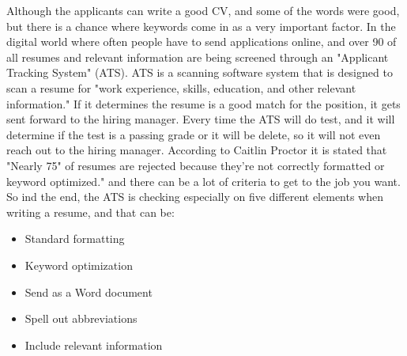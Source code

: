 Although the applicants can write a good CV, and some of the words were good,
but there is a chance where keywords come in as a very important factor. In the digital world where often people have to send applications online, and over 90 %
of all resumes and relevant information are being screened through an "Applicant Tracking System" (ATS). ATS is a scanning software system
that is designed to scan a resume for "work experience, skills, education, and other relevant information." %
If it determines the resume is a good match for the position, it gets sent forward to the hiring manager.
Every time the ATS will do test, and it will determine if the test is a passing grade or it will be delete, so it will not even reach out to the hiring manager.
According to Caitlin Proctor it is stated that "Nearly 75"
of resumes are rejected because they’re not correctly formatted or keyword optimized." and there can be a lot of criteria
to get to the job you want. %
So ind the end, the ATS is checking especially on five different elements when writing a resume, and that can be:
\begin{itemize}
\item Standard formatting
\item Keyword optimization
\item Send as a Word document
\item Spell out abbreviations
\item Include relevant information
\end{itemize}

